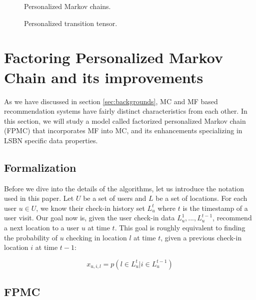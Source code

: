 \documentclass{sig-alternate}
\begin{document}
\begin{figure}
\centering
{}
\caption{Personalized Markov chains.}
\label{fig:FPMC_naive}
\end{figure}

\begin{figure}
\centering
{}
\caption{Personalized transition tensor.}
\label{fig:FPMC}
\end{figure}

\section{Factoring Personalized Markov Chain and its improvements}
\label{sec:fpmc}

As we have discussed in section \ref{sec:backgrounds}, MC and MF based recommendation systems
have fairly distinct characteristics from each other. In this section, we will study a model called 
factorized personalized Markov chain (FPMC) that incorporates MF into MC, and its 
enhancements specializing in LSBN specific data properties.

\subsection{Formalization}
\label{sec:typeChangesSpecialChars}

Before we dive into the details of the algorithms, let us introduce the notation used in this paper. 
Let $U$ be a set of users and $L$ be a set of locations. For each user $u \in U$, 
we know their check-in history set \begin{math}L^t_u\end{math} where $t$ is the timestamp 
of a user visit. Our goal now is, given the user check-in data 
\begin{math}L^1_u,...,L^{t-1}_u\end{math}, recommend a next location to 
a user $u$ at time $t$. This goal is roughly equivalent to finding the probability of $u$ 
checking in location $l$ at time $t$, given a previous check-in location $i$ at time $t-1$:

\begin{equation}
	x_{u,i,l}=p(l \in L_u^t | i \in L_u^{t-1})
\label{eq:goal}
\end{equation}

\subsection{FPMC}
\label{sec:typeChangesSpecialChars}
\end{document}
